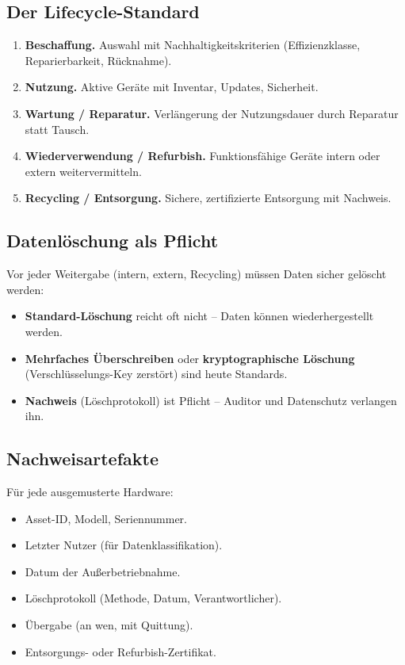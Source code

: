 \documentclass[11pt,a4paper,oneside]{article}
\newcommand{\fachbegriff}[1]{\textbf{#1}}
\begin{document}
\subsection{Der Lifecycle-Standard}

\begin{enumerate}
  \item \fachbegriff{Beschaffung.} Auswahl mit Nachhaltigkeitskriterien (Effizienzklasse, Reparierbarkeit, Rücknahme).
  \item \fachbegriff{Nutzung.} Aktive Geräte mit Inventar, Updates, Sicherheit.
  \item \fachbegriff{Wartung / Reparatur.} Verlängerung der Nutzungsdauer durch Reparatur statt Tausch.
  \item \fachbegriff{Wiederverwendung / Refurbish.} Funktionsfähige Geräte intern oder extern weitervermitteln.
  \item \fachbegriff{Recycling / Entsorgung.} Sichere, zertifizierte Entsorgung mit Nachweis.
\end{enumerate}

\subsection{Datenlöschung als Pflicht}

Vor jeder Weitergabe (intern, extern, Recycling) müssen Daten sicher gelöscht werden:

\begin{itemize}
  \item \textbf{Standard-Löschung} reicht oft nicht -- Daten können wiederhergestellt werden.
  \item \textbf{Mehrfaches Überschreiben} oder \textbf{kryptographische Löschung} (Verschlüsselungs-Key zerstört) sind heute Standards.
  \item \textbf{Nachweis} (Löschprotokoll) ist Pflicht -- Auditor und Datenschutz verlangen ihn.
\end{itemize}

\subsection{Nachweisartefakte}

Für jede ausgemusterte Hardware:

\begin{itemize}
  \item Asset-ID, Modell, Seriennummer.
  \item Letzter Nutzer (für Datenklassifikation).
  \item Datum der Außerbetriebnahme.
  \item Löschprotokoll (Methode, Datum, Verantwortlicher).
  \item Übergabe (an wen, mit Quittung).
  \item Entsorgungs- oder Refurbish-Zertifikat.
\end{itemize}
\end{document}
